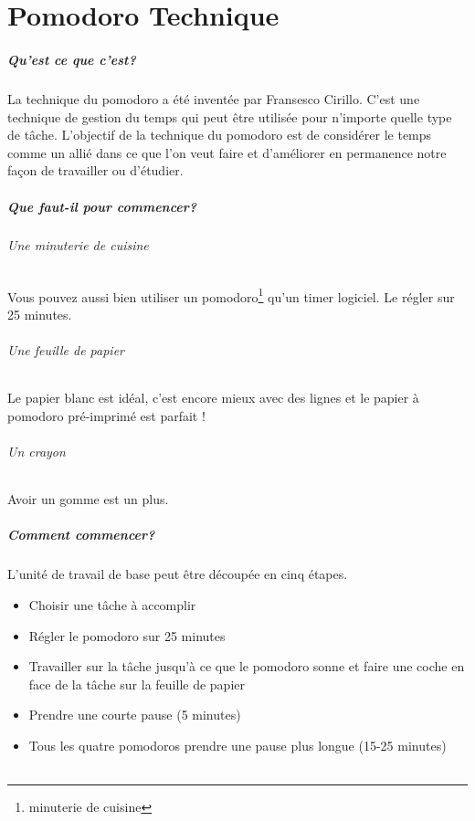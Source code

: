 \chapter{Pomodoro Technique}

\paragraph*{Qu'est ce que c'est?}La technique du pomodoro a été inventée par Fransesco Cirillo. C'est une technique de gestion du temps qui peut être utilisée pour n'importe quelle type de tâche. L'objectif de la technique du pomodoro est de considérer le temps comme un allié dans ce que l'on veut faire et d'améliorer en permanence notre façon de travailler ou d'étudier.

\paragraph*{Que faut-il pour commencer?}
\subparagraph*{Une minuterie de cuisine}
Vous pouvez aussi bien utiliser un pomodoro\footnote{minuterie de cuisine} qu'un timer logiciel. Le régler sur 25 minutes.

\subparagraph*{Une feuille de papier}
Le papier blanc est idéal, c'est encore mieux avec des lignes et le papier à pomodoro pré-imprimé est parfait !

\subparagraph*{Un crayon}
Avoir un gomme est un plus.

\paragraph*{Comment commencer?}
L'unité de travail de base peut être découpée en cinq étapes.
\begin{itemize}
\item{Choisir une tâche à accomplir}
\item{Régler le pomodoro sur 25 minutes}
\item{Travailler sur la tâche jusqu'à ce que le pomodoro sonne et faire une coche en face de la tâche sur la feuille de papier}
\item{Prendre une courte pause (5 minutes)}
\item{Tous les quatre pomodoros prendre une pause plus longue (15-25 minutes)}
\end{itemize}

\subparagraph*{}

 